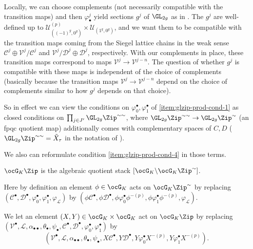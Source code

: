 \documentclass[a4paper]{scrartcl} %
\numberwithin{equation}{section}
\begin{document}
\begin{Proof}
  Locally, we can choose complements (not necessarily compatible with the transition maps) and then $\varphi_\bullet^j$ yield sections $g^j$ of $\GL_{2g}$ as in \cite[\nopp definition of $g\in G(S)$ in the proof of (4.3)]{mw}. The $g^j$ are well-defined up to $\mathcal{U}_{((-1)^g,0^g)}^{(p)}\times\mathcal{U}_{(1^g,0^g)}$, and we want them to be compatible with the transition maps coming from the Siegel lattice chains in the weak sense $\mathcal{C}^j\oplus\mathcal{V}^j/\mathcal{C}^j$ and $\mathcal{V}^j/\mathcal{D}^j\oplus\mathcal{D}^j$, respectively. With our complements in place, these transition maps correspond to maps $\mathcal{V}^j\to\mathcal{V}^{j-n}$. The question of whether $g^j$ is compatible with these maps is independent of the choice of complements (basically because the transition maps $\mathcal{V}^j\to\mathcal{V}^{j-n}$ depend on the choice of complements similar to how $g^j$ depends on that choice).

  So in effect we can view the conditions on $\varphi_0^\bullet,\varphi_1^\bullet$ of \eqref{item:glzip-prod-cond-1} as closed conditions on $\prod_{j\in J'}\GL_{2g}\Zip^{\sim\sim}$, where $\GL_{2g}\Zip^{\sim\sim}\to\GL_{2g}\Zip^{\sim}$ (an fpqc quotient map) additionally comes with complementary spaces of $C,D$ ($\GL_{2g}\Zip^{\sim\sim}=\tilde{X}_\tau$ in the notation of \cite[\nopp proof of (4.3)]{mw}).

  We also can reformulate condition \eqref{item:glzip-prod-cond-4} in those terms.
\end{Proof}




\begin{Corollary}
  $\ocG_K\Zip$ is the algebraic quotient stack $[\ocG_K\backslash\ocG_K\Zip^{\sim}]$.

  Here by definition an element $\phi\in\ocG_K$ acts on $\ocG_K\Zip^{\sim}$ by replacing $(\mathcal{C}^\bullet,\mathcal{D}^\bullet,\varphi_{0}^{\bullet},\varphi_{1}^{\bullet},\varphi_{\mathcal{L}})$ by \linebreak[3] $(\phi\mathcal{C}^\bullet,\phi\mathcal{D}^\bullet,\phi\varphi_{0}^{\bullet}\phi^{-(p)},\phi\varphi_{1}^{\bullet}\phi^{-(p)},\varphi_{\mathcal{L}})$.
\end{Corollary}



\begin{Definition}
  We let an element $(X,Y)\in\ocG_K\times\ocG_K$ act on $\ocG_K\Zip$ by replacing $(\mathcal{V}^\bullet,\mathcal{L},\alpha_{\bullet\bullet},\theta_\bullet,\psi_\bullet,\mathcal{C}^\bullet,\mathcal{D}^\bullet,\varphi_{0}^{\bullet},\varphi_{1}^{\bullet})$ by
  \begin{equation*}
    (\mathcal{V}^\bullet,\mathcal{L},\alpha_{\bullet\bullet},\theta_\bullet,\psi_\bullet,
    X\mathcal{C}^\bullet,Y\mathcal{D}^\bullet,
    Y\varphi_{0}^{\bullet}X^{-(p)},Y\varphi_{1}^{\bullet}X^{-(p)}).
  \end{equation*}
\end{Definition}
\end{document}
